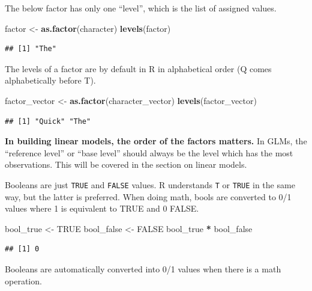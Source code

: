 \documentclass[
  openany]{book}
\newenvironment{Shaded}{\begin{snugshade}}{\end{snugshade}}
\newcommand{\KeywordTok}[1]{\textcolor[rgb]{0.13,0.29,0.53}{\textbf{#1}}}
\newcommand{\NormalTok}[1]{#1}
\newcommand{\OperatorTok}[1]{\textcolor[rgb]{0.81,0.36,0.00}{\textbf{#1}}}
\newcommand{\OtherTok}[1]{\textcolor[rgb]{0.56,0.35,0.01}{#1}}
\newcommand{\StringTok}[1]{\textcolor[rgb]{0.31,0.60,0.02}{#1}}
\begin{document}
The below factor has only one ``level'', which is the list of assigned values.

\begin{Shaded}
\begin{Highlighting}[]
\NormalTok{factor <-}\StringTok{ }\KeywordTok{as.factor}\NormalTok{(character)}
\KeywordTok{levels}\NormalTok{(factor)}
\end{Highlighting}
\end{Shaded}

\begin{verbatim}
## [1] "The"
\end{verbatim}

The levels of a factor are by default in R in alphabetical order (Q comes alphabetically
before T).

\begin{Shaded}
\begin{Highlighting}[]
\NormalTok{factor_vector <-}\StringTok{ }\KeywordTok{as.factor}\NormalTok{(character_vector)}
\KeywordTok{levels}\NormalTok{(factor_vector)}
\end{Highlighting}
\end{Shaded}

\begin{verbatim}
## [1] "Quick" "The"
\end{verbatim}

\textbf{In building linear models, the order of the factors matters.} In GLMs, the
``reference level'' or ``base level'' should always be the level which has the most
observations. This will be covered in the section on linear models.

Booleans are just \texttt{TRUE} and \texttt{FALSE} values. R understands \texttt{T} or \texttt{TRUE} in the
same way, but the latter is preferred. When doing math, bools are converted to
0/1 values where 1 is equivalent to TRUE and 0 FALSE.

\begin{Shaded}
\begin{Highlighting}[]
\NormalTok{bool_true <-}\StringTok{ }\OtherTok{TRUE}
\NormalTok{bool_false <-}\StringTok{ }\OtherTok{FALSE}
\NormalTok{bool_true }\OperatorTok{*}\StringTok{ }\NormalTok{bool_false}
\end{Highlighting}
\end{Shaded}

\begin{verbatim}
## [1] 0
\end{verbatim}

Booleans are automatically converted into 0/1 values when there is a math operation.
\end{document}
